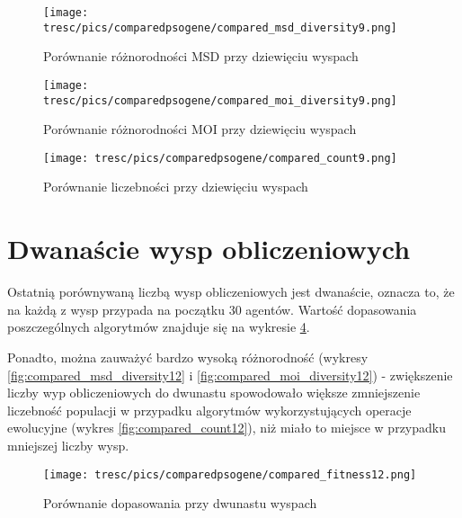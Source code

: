 \clearpage

\begin{figure}[H]
\begin{center} 
\texttt{[image: tresc/pics/comparedpsogene/compared\_msd\_diversity9.png]}
\caption{Porównanie różnorodności MSD przy dziewięciu wyspach}
\label{fig:compared_msd_diversity9}
\end{center}
\end{figure}

\begin{figure}[H]
\begin{center} 
\texttt{[image: tresc/pics/comparedpsogene/compared\_moi\_diversity9.png]}
\caption{Porównanie różnorodności MOI przy dziewięciu wyspach}
\label{fig:compared_moi_diversity9}
\end{center}
\end{figure}

\begin{figure}[H]
\begin{center} 
\texttt{[image: tresc/pics/comparedpsogene/compared\_count9.png]}
\caption{Porównanie liczebności przy dziewięciu wyspach}
\label{fig:compared_count9}
\end{center}
\end{figure}


\section{Dwanaście wysp obliczeniowych}
\label{sec:dwanasciewysp}

Ostatnią porównywaną liczbą wysp obliczeniowych jest dwanaście, oznacza to, że na każdą z wysp przypada na początku 30 agentów. Wartość dopasowania poszczególnych algorytmów znajduje się na wykresie \ref{fig:compared_fintess12}.

Ponadto, można zauważyć bardzo wysoką różnorodność (wykresy \ref{fig:compared_msd_diversity12} i \ref{fig:compared_moi_diversity12}) - zwiększenie liczby wyp obliczeniowych do dwunastu spowodowało większe zmniejszenie liczebność populacji w przypadku algorytmów wykorzystujących operacje ewolucyjne (wykres \ref{fig:compared_count12}), niż miało to miejsce w przypadku mniejszej liczby wysp.

\clearpage

\begin{figure}[H]
\begin{center} 
\texttt{[image: tresc/pics/comparedpsogene/compared\_fitness12.png]}
\caption{Porównanie dopasowania przy dwunastu wyspach}
\label{fig:compared_fintess12}
\end{center}
\end{figure}



